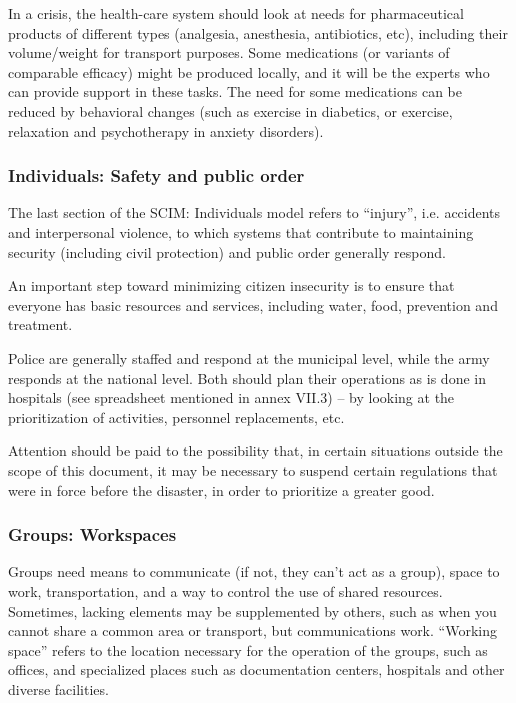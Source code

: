 \documentclass[12pt, a4]{scrartcl}
\begin{document}
In a crisis, the health-care system should look at needs for pharmaceutical products of different types (analgesia, anesthesia, antibiotics, etc), including their volume/weight for transport purposes. Some medications (or variants of comparable efficacy) might be produced locally, and it will be the experts who can provide support in these tasks. The need for some medications can be reduced by behavioral changes (such as exercise in diabetics, or exercise, relaxation and psychotherapy in anxiety disorders).

\subsubsection{Individuals: Safety and public order}
The last section of the SCIM: Individuals model refers to “injury”, i.e. accidents and interpersonal violence, to which systems that contribute to maintaining security (including civil protection) and public order generally respond.

An important step toward minimizing citizen insecurity is to ensure that everyone has basic resources and services, including water, food, prevention and treatment.

Police are generally staffed and respond at the municipal level, while the army responds at the national level. Both should plan their operations as is done in hospitals (see spreadsheet mentioned in annex VII.3) – by looking at the prioritization of activities, personnel replacements, etc. 

Attention should be paid to the possibility that, in certain situations outside the scope of this document, it may be necessary to suspend certain regulations that were in force before the disaster, in order to prioritize a greater good.

\subsubsection{Groups: Workspaces}

Groups need means to communicate (if not, they can’t act as a group), space to work, transportation, and a way to control the use of shared resources. Sometimes, lacking elements may be supplemented by others, such as when you cannot share a common area or transport, but communications work. “Working space” refers to the location necessary for the operation of the groups, such as offices, and specialized places such as documentation centers, hospitals and other diverse facilities. 
\end{document}
